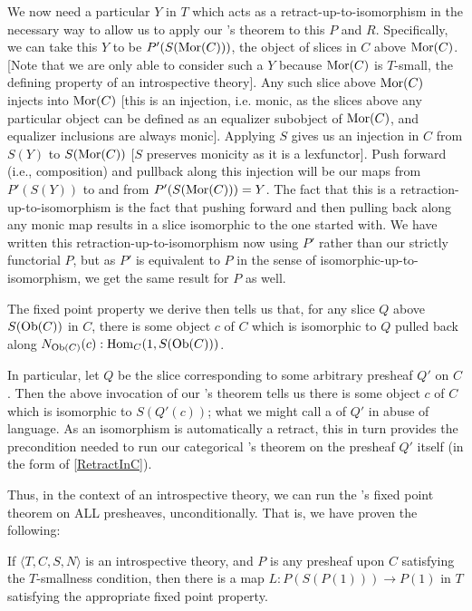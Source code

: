 We now need a particular $Y$ in $T$ which acts as a retract-up-to-isomorphism in the necessary way to allow us to apply our \Loeb's theorem to this $P$ and $R$. Specifically, we can take this $Y$ to be $P'(S(\operatorname{Mor}(C)))$, the object of slices in $C$ above $\operatorname{Mor}(C)$. [Note that we are only able to consider such a $Y$ because $\operatorname{Mor}(C)$ is $T$-small, the defining property of an introspective theory]. Any such slice above $\operatorname{Mor}(C)$ injects into $\operatorname{Mor}(C)$ [this is an injection, i.e. monic, as the slices above any particular object can be defined as an equalizer subobject of $\operatorname{Mor}(C)$, and equalizer inclusions are always monic]. Applying $S$ gives us an injection in $C$ from $S(Y)$ to $S(\operatorname{Mor}(C))$ [$S$ preserves monicity as it is a lexfunctor]. Push forward (i.e., composition) and pullback along this injection will be our maps from $P'(S(Y))$ to and from $P'(S(\operatorname{Mor}(C))) = Y$. The fact that this is a retraction-up-to-isomorphism is the fact that pushing forward and then pulling back along any monic map results in a slice isomorphic to the one started with. We have written this retraction-up-to-isomorphism now using $P'$ rather than our strictly functorial $P$, but as $P'$ is equivalent to $P$ in the sense of isomorphic-up-to-isomorphism, we get the same result for $P$ as well. 

The fixed point property we derive then tells us that, for any slice $Q$ above $S(\operatorname{Ob}(C))$ in $C$, there is some object $c$ of $C$ which is isomorphic to $Q$ pulled back along $N_{\operatorname{Ob}(C)}(c) : \operatorname{Hom}_C(1, S(\operatorname{Ob}(C)))$. 

In particular, let $Q$ be the slice corresponding to some arbitrary presheaf $Q'$ on $C$. Then the above invocation of our \Loeb's theorem tells us there is some object $c$ of $C$ which is isomorphic to $S(Q'(c))$; what we might call a  of $Q'$ in abuse of language. As an isomorphism is automatically a retract, this in turn provides the precondition needed to run our categorical \Loeb's theorem on the presheaf $Q'$ itself (in the form of \cref{RetractInC}).

Thus, in the context of an introspective theory, we can run the \Loeb's fixed point theorem on ALL presheaves, unconditionally. That is, we have proven the following:

\begin{corollary}\label{LoebInIntrosp}
If $\langle T, C, S, N \rangle$ is an introspective theory, and $P$ is any presheaf upon $C$ satisfying the $T$-smallness condition, then there is a map $L : P(S(P(1))) \to P(1)$ in $T$ satisfying the appropriate fixed point property.
\end{corollary}

